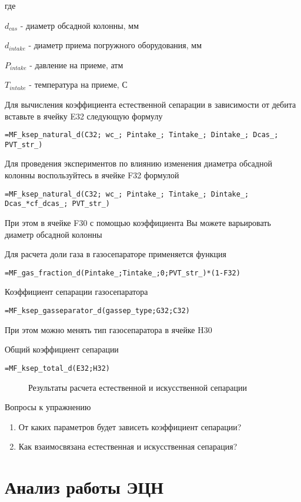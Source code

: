 где

$d_{cas}$ - диаметр обсадной колонны, мм

$d_{intake}$ - диаметр приема погружного оборудования, мм

$P_{intake}$ - давление на приеме, атм

$T_{intake}$ - температура на приеме, С

Для вычисления коэффициента естественной сепарации в зависимости от дебита вставьте в ячейку E32 следующую формулу 

{ \small  \texttt{=MF\_ksep\_natural\_d(C32; wc\_; Pintake\_; Tintake\_; Dintake\_; Dcas\_; PVT\_str\_)}}

Для проведения экспериментов по влиянию изменения диаметра обсадной колонны воспользуйтесь в ячейке F32 формулой

{ \small  \texttt{=MF\_ksep\_natural\_d(C32; wc\_; Pintake\_; Tintake\_; Dintake\_; Dcas\_*cf\_dcas\_; PVT\_str\_)}}

При этом в ячейке F30 с помощью коэффициента Вы можете варьировать диаметр обсадной колонны

Для расчета доли газа в газосепараторе применяется функция

{ \small  \texttt{=MF\_gas\_fraction\_d(Pintake\_;Tintake\_;0;PVT\_str\_)*(1-F32)
}}

Коэффициент сепарации газосепаратора

{ \small  \texttt{=MF\_ksep\_gasseparator\_d(gassep\_type;G32;C32)
}}

При этом можно менять тип газосепаратора в ячейке H30

Общий коэффициент сепарации

{ \small  \texttt{=MF\_ksep\_total\_d(E32;H32)
}}

\begin{figure}[h!]
	\center{\texttt{[image: Ex60\_2]}}
	\caption{Результаты расчета естественной и искусственной сепарации}
	\label{ris:Ex60_2}
\end{figure}

Вопросы к упражнению

\begin{enumerate}
	\item От каких параметров будет зависеть коэффициент сепарации?
	\item Как взаимосвязана естественная и искусственная сепарация? 
\end{enumerate}


\section{Анализ работы ЭЦН}

